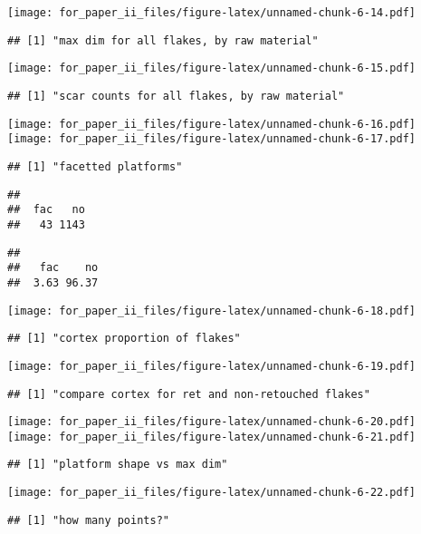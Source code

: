 \documentclass[]{article}
\begin{document}
\texttt{[image: for\_paper\_ii\_files/figure-latex/unnamed-chunk-6-14.pdf]}

\begin{verbatim}
## [1] "max dim for all flakes, by raw material"
\end{verbatim}

\texttt{[image: for\_paper\_ii\_files/figure-latex/unnamed-chunk-6-15.pdf]}

\begin{verbatim}
## [1] "scar counts for all flakes, by raw material"
\end{verbatim}

\texttt{[image: for\_paper\_ii\_files/figure-latex/unnamed-chunk-6-16.pdf]}
\texttt{[image: for\_paper\_ii\_files/figure-latex/unnamed-chunk-6-17.pdf]}

\begin{verbatim}
## [1] "facetted platforms"
\end{verbatim}

\begin{verbatim}
## 
##  fac   no 
##   43 1143
\end{verbatim}

\begin{verbatim}
## 
##   fac    no 
##  3.63 96.37
\end{verbatim}

\texttt{[image: for\_paper\_ii\_files/figure-latex/unnamed-chunk-6-18.pdf]}

\begin{verbatim}
## [1] "cortex proportion of flakes"
\end{verbatim}

\texttt{[image: for\_paper\_ii\_files/figure-latex/unnamed-chunk-6-19.pdf]}

\begin{verbatim}
## [1] "compare cortex for ret and non-retouched flakes"
\end{verbatim}

\texttt{[image: for\_paper\_ii\_files/figure-latex/unnamed-chunk-6-20.pdf]}
\texttt{[image: for\_paper\_ii\_files/figure-latex/unnamed-chunk-6-21.pdf]}

\begin{verbatim}
## [1] "platform shape vs max dim"
\end{verbatim}

\texttt{[image: for\_paper\_ii\_files/figure-latex/unnamed-chunk-6-22.pdf]}

\begin{verbatim}
## [1] "how many points?"
\end{verbatim}
\end{document}

